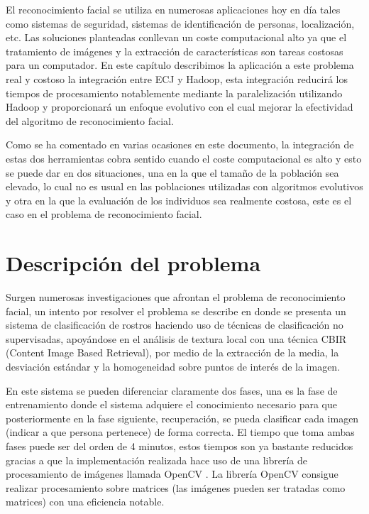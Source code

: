 \label{problema-facerecognition}

El reconocimiento facial se utiliza en numerosas aplicaciones hoy en día tales como sistemas de seguridad, sistemas de identificación de personas, localización, etc. Las soluciones planteadas conllevan un coste computacional alto ya que el tratamiento de imágenes y la extracción de características son tareas costosas para un computador. En este cap\'itulo describimos la aplicación a este problema real y costoso la integración entre ECJ y Hadoop, esta integración reducir\'a los tiempos de procesamiento notablemente mediante la paralelizaci\'on utilizando Hadoop y proporcionar\'a un enfoque evolutivo con el cual mejorar la efectividad del algoritmo de reconocimiento facial.

Como se ha comentado en varias ocasiones en este documento, la integración de estas dos herramientas cobra sentido cuando el coste computacional es alto y esto se puede dar en dos situaciones, una en la que el tama\~no de la población sea elevado, lo cual no es usual en las poblaciones utilizadas con algoritmos evolutivos y otra en la que la evaluación de los individuos sea realmente costosa, este es el caso en el problema de reconocimiento facial.

\section{Descripci\'on del problema}

Surgen numerosas investigaciones que afrontan el problema de reconocimiento facial, un intento por resolver el problema se describe en \cite{paper-facerecognition} donde se presenta un sistema de clasificación de rostros haciendo uso de técnicas de clasificaci\'on no supervisadas, apoy\'andose en el an\'alisis de textura local con una t\'ecnica CBIR (Content Image Based Retrieval), por medio de la extracci\'on de la media, la desviaci\'on est\'andar y la homogeneidad sobre puntos de inter\'es de la imagen.

En este sistema se pueden diferenciar claramente dos fases, una es la fase de entrenamiento donde el sistema adquiere el conocimiento necesario para que posteriormente en la fase siguiente, recuperación, se pueda clasificar cada imagen (indicar a que persona pertenece) de forma correcta. El tiempo que toma ambas fases puede ser del orden de 4 minutos, estos tiempos son ya bastante reducidos gracias a que la implementaci\'on realizada hace uso de una librería de procesamiento de im\'agenes llamada OpenCV \cite{opencv}. La librería OpenCV consigue realizar procesamiento sobre matrices (las imágenes pueden ser tratadas como matrices) con una eficiencia notable.

